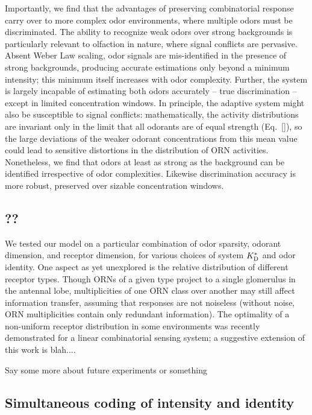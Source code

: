 Importantly, we find that the advantages of preserving combinatorial response carry over to more complex odor environments, where multiple odors must be discriminated. The ability to recognize weak odors over strong backgrounds is particularly relevant to olfaction in nature, where signal conflicts are pervasive. Absent Weber Law scaling, odor signals are mis-identified in the presence of strong backgrounds, producing accurate estimations only beyond a minimum intensity; this minimum itself increases with odor complexity. Further, the system is largely incapable of estimating both odors accurately -- true discrimination -- except in limited concentration windows. In principle, the adaptive system might also be susceptible to signal conflicts: mathematically, the activity distributions are invariant only in the limit that all odorants are of equal strength (Eq.~\ref{}), so the large deviations of the weaker odorant concentrations from this mean value could lead to sensitive distortions in the distribution of ORN activities. Nonetheless, we find that odors at least as strong as the background can be identified irrespective of odor complexities. Likewise discrimination accuracy is more robust, preserved over sizable concentration windows. 


\subsection*{??}
We tested our model on a particular combination of odor sparsity, odorant dimension, and receptor dimension, for various choices of system $K^*_{\text D}$ and odor identity. One aspect as yet unexplored is the relative distribution of different receptor types. Though ORNs of a given type project to a single glomerulus in the antennal lobe, multiplicities of one ORN class over another may still affect information transfer, assuming that responses are not noiseless (without noise, ORN multiplicities contain only redundant information). The optimality of a non-uniform receptor distribution in some environments was recently demonstrated for a linear combinatorial sensing system; a suggestive extension of this work is blah....





{\color{blue} Say some more about future experiments or something}


\subsection*{Simultaneous coding of intensity and identity}

